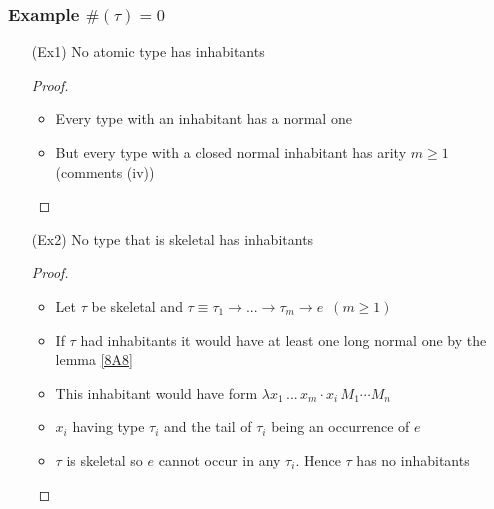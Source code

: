 \begin{frame}
\frametitle{Example $\#(\tau) = 0$}
\begin{itemize}
 \item[(Ex1)] No atomic type has inhabitants
\begin{proof}
 \begin{itemize}
  \item Every type with an inhabitant has a normal one
  \item But every type with a closed normal inhabitant has arity $m \geq 1$  (comments (iv))
 \end{itemize}
\end{proof}
 
 \item[(Ex2)] No type that is skeletal has inhabitants
\begin{proof}
  \begin{itemize}
   \item Let $\tau$ be skeletal and $\tau \equiv \tau_1 \to ... \to \tau_m \to e\,\,\,(m \geq 1)$
   \item If $\tau$ had inhabitants it would have at least one long normal one by the lemma \ref{8A8}
   \item This inhabitant would have form
    $\lambda x_1\,...\,x_m\cdot x_i\,M_1\cdots M_n$
   \item $x_i$ having type $\tau_i$ and the tail of $\tau_i$ being an occurrence of $e$
   \item $\tau$ is skeletal so $e$ cannot occur in any $\tau_i$. Hence $\tau$ has no inhabitants
  \end{itemize}
\end{proof}
\end{itemize}

\end{frame}

